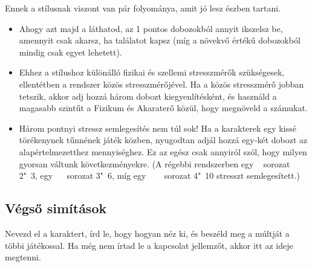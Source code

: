 Ennek a stílusnak viszont van pár folyománya, amit jó lesz észben tartani.

\begin{itemize}
    \item Ahogy azt majd a  láthatod, az 1 pontos dobozokból annyit ikszelsz be, amennyit csak akarsz, ha találatot kapsz (míg a növekvő értékű dobozokból mindig csak egyet lehetett).
    \item Ehhez a stílushoz különálló fizikai és szellemi stresszmérők szükségesek, ellentétben a  rendszer közös stresszmérőjével. Ha a közös stresszmérő jobban tetszik, akkor adj hozzá három dobozt kiegyenlítésként, és használd a magasabb szintűt a Fizikum és Akaraterő közül, hogy megnöveld a számukat.
    \item Három pontnyi stressz semlegesítés nem túl sok! Ha a karakterek egy kissé törékenynek tűnnének játék közben, nyugodtan adjál hozzá egy‑két dobozt az alapértelmezetthez mennyiséghez. Ez az egész csak annyiról szól, hogy milyen gyorsan váltunk következményekre. (A régebbi rendszerben egy ~ sorozat 2"~3, egy ~~ sorozat 3"~6, míg egy ~~~ sorozat 4"~10 stresszt semlegesített.)
\end{itemize}

\subsection{Végső simítások}

Nevezd el a karaktert, írd le, hogy hogyan néz ki, és beszéld meg a múltját a többi játékossal. Ha még nem írtad le a kapcsolat jellemzőt, akkor itt az ideje megtenni.
